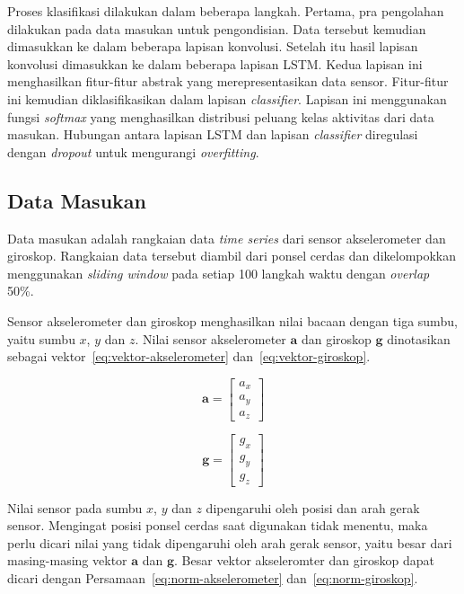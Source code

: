 Proses klasifikasi dilakukan dalam beberapa langkah. Pertama, pra pengolahan dilakukan pada data masukan untuk pengondisian. Data tersebut kemudian dimasukkan ke dalam beberapa lapisan konvolusi. Setelah itu hasil lapisan konvolusi dimasukkan ke dalam beberapa lapisan LSTM\@. Kedua lapisan ini menghasilkan fitur-fitur abstrak yang merepresentasikan data sensor. Fitur-fitur ini kemudian diklasifikasikan dalam lapisan \textit{classifier}. Lapisan ini menggunakan fungsi \textit{softmax} yang menghasilkan distribusi peluang kelas aktivitas dari data masukan. Hubungan antara lapisan LSTM dan lapisan \textit{classifier} diregulasi dengan \textit{dropout} untuk mengurangi \textit{overfitting}.

\subsection{Data Masukan}
Data masukan adalah rangkaian data \textit{time series} dari sensor akselerometer dan giroskop. Rangkaian data tersebut diambil dari ponsel cerdas dan dikelompokkan menggunakan \textit{sliding window} pada setiap 100 langkah waktu dengan \textit{overlap} 50\%.

Sensor akselerometer dan giroskop menghasilkan nilai bacaan dengan tiga sumbu, yaitu sumbu $x$, $y$ dan $z$. Nilai sensor akselerometer $\pmb{a}$ dan giroskop $\pmb{g}$ dinotasikan sebagai vektor~\ref{eq:vektor-akselerometer} dan~\ref{eq:vektor-giroskop}.

\begin{equation}
    \label{eq:vektor-akselerometer}
    \pmb{a} = 
    \begin{bmatrix}
        a_x \\
        a_y \\
        a_z
    \end{bmatrix}
\end{equation}

\begin{equation}
    \label{eq:vektor-giroskop}
    \pmb{g} = 
    \begin{bmatrix}
        g_x \\
        g_y \\
        g_z
    \end{bmatrix}
\end{equation}

Nilai sensor pada sumbu $x$, $y$ dan $z$ dipengaruhi oleh posisi dan arah gerak sensor. Mengingat posisi ponsel cerdas saat digunakan tidak menentu, maka perlu dicari nilai yang tidak dipengaruhi oleh arah gerak sensor, yaitu besar dari masing-masing vektor $\pmb{a}$ dan $\pmb{g}$. Besar vektor akseleromter dan giroskop dapat dicari dengan Persamaan~\ref{eq:norm-akselerometer} dan~\ref{eq:norm-giroskop}.

